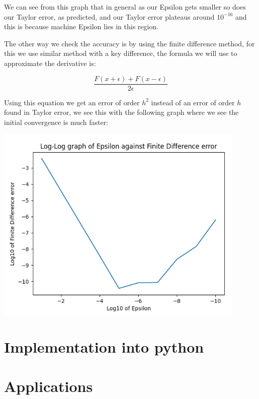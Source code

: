 \documentclass{article}
\begin{document}
We can see from this graph that in general as our Epsilon gets smaller so does our Taylor error, as predicted, and our Taylor error plateaus around $10^{-16}$ and this is because machine Epsilon lies in this region.

The other way we check the accuracy is by using the finite difference method, for this we use similar method with a key difference, the formula we will use to approximate the derivative is:

\begin{equation}
    \frac{F(x + \epsilon) + F(x - \epsilon)}{2 \epsilon}
\end{equation}

Using this equation we get an error of order $h^2$ instead of an error of order $h$ found in Taylor error, we see this with the following graph where we see the initial convergence is much faster:

\begin{center}
    \includegraphics[width=12cm]{images/Finite_Difference_error_1.png}
\end{center}


\section{Implementation into python}

\section{Applications}
\end{document}
